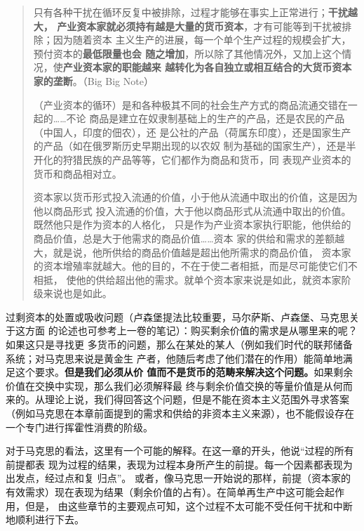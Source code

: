 \begin{quotation}
  只有各种干扰在循环反复中被排除，过程才能够在事实上正常进行；\textbf{干扰越大，
    产业资本家就必须持有越是大量的货币资本}，才有可能等到干扰被排除；因为随着资本
  主义生产的进展，每一个单个生产过程的规模会扩大，预付资本的\textbf{最低限量也会
    随之增加}，所以除了其他情况外，又加上这个情况，使\textbf{产业资本家的职能越来
    越转化为各自独立或相互结合的大货币资本家的垄断}。（Big Big Note）

  （产业资本的循环）是和各种极其不同的社会生产方式的商品流通交错在一起的……不论
  商品是建立在奴隶制基础上的生产的产品，还是农民的产品（中国人，印度的佃农），还
  是公社的产品（荷属东印度），还是国家生产的产品（如在俄罗斯历史早期出现的以农奴
  制为基础的国家生产），还是半开化的狩猎民族的产品等等，它们都作为商品和货币，同
  表现产业资本的货币和商品相对立。 

  资本家以货币形式投入流通的价值，小于他从流通中取出的价值，这是因为他以商品形式
  投入流通的价值，大于他以商品形式从流通中取出的价值。既然他只是作为资本的人格化，
  只是作为产业资本家执行职能，他供给的商品价值，总是大于他需求的商品价值……资本
  家的供给和需求的差额越大，就是说，他所供给的商品价值越是超出他所需求的商品价值，
  资本家的资本增殖率就越大。他的目的，不在于使二者相抵，而是尽可能使它们不相抵，
  使他的供给超出他的需求。就单个资本家来说是如此，就资本家阶级来说也是如此。 

\end{quotation}

过剩资本的处置或吸收问题（卢森堡提法比较重要，马尔萨斯、卢森堡、马克思关于这方面
的论述也可参考上一卷的笔记）：购买剩余价值的需求是从哪里来的呢？如果这只是寻找更
多货币的问题，那么在某处的某人（例如我们时代的联邦储备系统；对马克思来说是黄金生
产者，他随后考虑了他们潜在的作用）能简单地满足这个要求。\textbf{但是我们必须从价
  值而不是货币的范畴来解决这个问题。}如果剩余价值在交换中实现，那么我们必须解释最
终与剩余价值交换的等量价值是从何而来的。从理论上说，我们得回答这个问题，但是不能在资本主义范围外寻求答案（例如马克思在本章前面提到的需求和供给的非资本主义来源），也不能假设存在一个专门进行挥霍性消费的阶级。

对于马克思的看法，这里有一个可能的解释。在这一章的开头，他说“过程的所有前提都表
现为过程的结果，表现为过程本身所产生的前提。每一个因素都表现为出发点，经过点和复
归点”。 或者，像马克思一开始说的那样，前提（资本家的
有效需求）现在表现为结果（剩余价值的占有）。在简单再生产中这可能会起作用，但是，
由这些章节的主要观点可知，这个过程不太可能不受任何干扰和中断地顺利进行下去。


